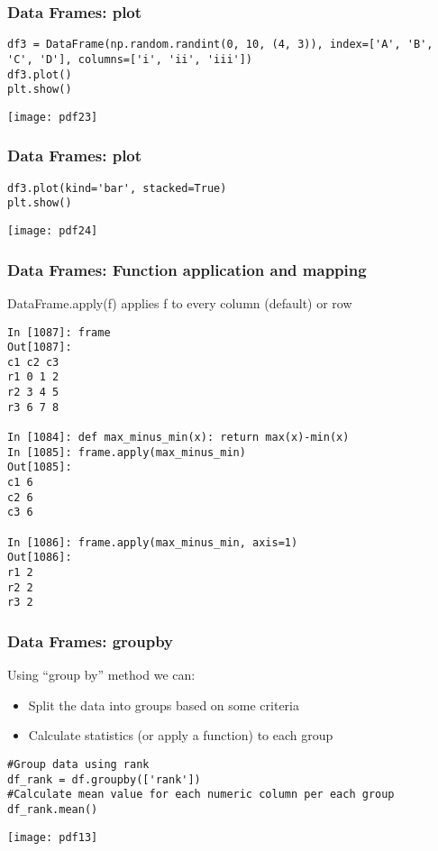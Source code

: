 \begin{frame}[fragile]
\frametitle{Data Frames: plot}
\begin{lstlisting}
df3 = DataFrame(np.random.randint(0, 10, (4, 3)), index=['A', 'B', 'C', 'D'], columns=['i', 'ii', 'iii'])
df3.plot()
plt.show()
\end{lstlisting}
\begin{center}
\texttt{[image: pdf23]}
\end{center}
\end{frame}

\begin{frame}[fragile]
\frametitle{Data Frames: plot}
\begin{lstlisting}
df3.plot(kind='bar', stacked=True)
plt.show()
\end{lstlisting}
\begin{center}
\texttt{[image: pdf24]}
\end{center}
\end{frame}


\begin{frame}[fragile]
\frametitle{Data Frames: Function application and mapping}
DataFrame.apply(f) applies f to every column (default) or row
\begin{lstlisting}
In [1087]: frame
Out[1087]: 
c1 c2 c3
r1 0 1 2
r2 3 4 5
r3 6 7 8

In [1084]: def max_minus_min(x): return max(x)-min(x)
In [1085]: frame.apply(max_minus_min)
Out[1085]: 
c1 6
c2 6
c3 6

In [1086]: frame.apply(max_minus_min, axis=1)
Out[1086]: 
r1 2
r2 2
r3 2
\end{lstlisting}

\end{frame}



\begin{frame}[fragile]
\frametitle{Data Frames: groupby}
Using ``group by'' method we can:
\begin{itemize}
\item Split the data into groups based on some criteria
\item Calculate statistics (or apply a function) to each group
\end{itemize}

\begin{lstlisting}
#Group data using rank
df_rank = df.groupby(['rank'])
#Calculate mean value for each numeric column per each group
df_rank.mean()
\end{lstlisting}

\begin{center}
\texttt{[image: pdf13]}
\end{center}
\end{frame}

